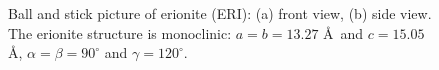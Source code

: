 \begin{figure}[t]
  \centering
  \caption{Ball and stick picture of erionite (ERI): (a) front view, (b) side view. The erionite structure is
           monoclinic: $a=b=13.27$ \AA\ and $c=15.05$ \AA, $\alpha=\beta=90^\circ$ and $\gamma=120^\circ$.}
  \label{Fig: ERI ball-and-stick}
\end{figure}


